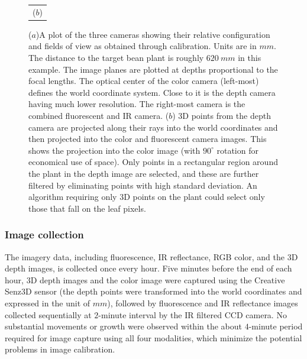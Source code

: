 \begin{figure}
\begin{tabular}{c}
  ($b$)\\
\end{tabular}
\caption{($a$)A plot of the three cameras showing their relative configuration and fields of view as obtained through calibration.  Units are in $mm$. The distance to the target bean plant is roughly $620~mm$ in this example.  The image planes are plotted at depths proportional to the focal lengths.  The optical center of the color camera (left-most) defines the world coordinate system.  Close to it is the depth camera having much lower resolution.  The right-most camera is the combined fluorescent and IR camera. ($b$) $3$D points from the depth camera are projected along their rays into the world coordinates and then projected into the color and fluorescent camera images.  This shows the projection into the color image (with $90^{\circ}$ rotation for economical use of space).  Only points in a rectangular region around the plant in the depth image are selected, and these are further filtered by eliminating points with high standard deviation.  An algorithm requiring only $3$D points on the plant could select only those that fall on the leaf pixels.}
\label{fig:CameraConfiguration}
\end{figure}


\subsubsection{Image collection}
The imagery data, including fluorescence, IR reflectance,  RGB color, and the $3$D depth images, is collected once every hour.
Five minutes before the end of each hour, $3$D depth images and the color image were captured using the Creative Senz3D sensor (the depth points were transformed into the world coordinates and expressed in the unit of $mm$), followed by fluorescence and IR reflectance images collected sequentially at $2$-minute interval by the IR filtered CCD camera.
No substantial movements or growth were observed within the about $4$-minute period required for image capture using all four modalities, which minimize the potential problems in image calibration.

%

